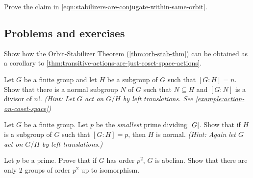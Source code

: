 \documentclass[./main.tex]{subfiles}
\begin{document}
\begin{exercise}
    Prove the claim in \cref{eqn:stabilizers-are-conjugate-within-same-orbit}.
\end{exercise}

\subsection{Problems and exercises}

\begin{exercise}
    Show how the Orbit-Stabilizer Theorem (\cref{thm:orb-stab-thm}) can be
    obtained as a corollary to
    \cref{thm:transitive-actions-are-just-coset-space-actions}.
\end{exercise}

\begin{exercise}
    Let $G$ be a finite group and let $H$ be a subgroup of $G$ such that $[G:H]
    = n$. Show that there is a normal subgroup $N$ of $G$ such that $N \subseteq
    H$ and $[G:N]$ is a divisor of $n!$. \textit{(Hint: Let $G$ act on $G/H$ by
    left translations. See \cref{example:action-on-coset-space})}
\end{exercise}

\begin{exercise}
    Let $G$ be a finite group. Let $p$ be the \emph{smallest} prime dividing
    $\abs G$. Show that if $H$ is a subgroup of $G$ such that $[G:H] = p$, then
    $H$ is normal. \textit{(Hint: Again let $G$ act on $G/H$ by left
    translations.)}
\end{exercise}

\begin{exercise}
    Let $p$ be a prime. Prove that if $G$ has order $p^2$, $G$ is abelian. Show
    that there are only 2 groups of order $p^2$ up to isomorphism.
\end{exercise}
\end{document}
